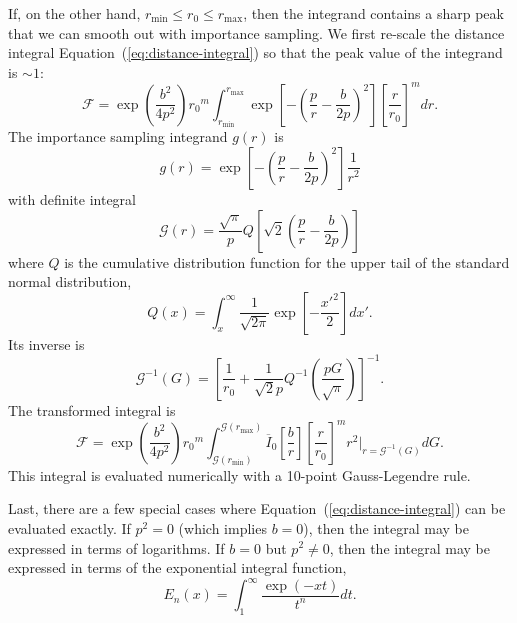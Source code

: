 \documentclass[amsmath,amssymb,aps,prx,reprint,nopreprintnumbers,nofootinbib]{revtex4-1}
\begin{document}
If, on the other hand, $r_\mathrm{min} \leq r_0 \leq r_\mathrm{max}$, then the integrand contains a sharp peak that we can smooth out with importance sampling. We first re-scale the distance integral Equation~(\ref{eq:distance-integral}) so that the peak value of the integrand is $\sim 1$:
%
\begin{equation}
    \mathscr{F} = \exp\left(\frac{b^2}{4p^2}\right)
        {r_0}^m
        \int_{r_\mathrm{min}}^{r_\mathrm{max}}
        \exp\left[-\left(\frac{p}{r} - \frac{b}{2p}\right)^2\right]
        \left[\frac{r}{r_0}\right]^m
        dr.
\end{equation}
%
The importance sampling integrand $g(r)$ is
%
\begin{equation}
    g(r) = \exp\left[-\left(\frac{p}{r} - \frac{b}{2p}\right)^2\right]
        \frac{1}{r^2}
\end{equation}
%
with definite integral
%
\begin{equation}
    \mathscr{G}(r) = \frac{\sqrt{\pi}}{p}
        Q\left[\sqrt{2}\left(\frac{p}{r} - \frac{b}{2p}\right)\right]
\end{equation}
%
where $Q$ is the cumulative distribution function for the upper tail of the standard normal distribution,
%
\begin{equation}
    Q(x) = \int_x^\infty \frac{1}{\sqrt{2\pi}} \exp \left[-\frac{{x'}^2}{2}\right] dx'.
\end{equation}
%
Its inverse is
%
\begin{equation}
    \mathscr{G}^{-1}(G) = \left[\frac{1}{r_0} + \frac{1}{\sqrt{2}p}
    Q^{-1}\left(\frac{p G}{\sqrt{\pi}}\right)\right]^{-1}.
\end{equation}
%
The transformed integral is
%
\begin{equation}
    \mathscr{F} = \exp\left(\frac{b^2}{4p^2}\right)
        {r_0}^m
        \int_{\mathscr{G}(r_\mathrm{min})}^{\mathscr{G}(r_\mathrm{max})}
        \overline{I}_0\left[\frac{b}{r}\right]
        \left[\frac{r}{r_0}\right]^m r^2
        \Bigg|_{r = \mathscr{G}^{-1}(G)}
        dG.
\end{equation}
%
This integral is evaluated numerically with a 10\nobreakdashes-point Gauss-Legendre rule.

Last, there are a few special cases where Equation~(\ref{eq:distance-integral}) can be evaluated exactly. If $p^2=0$ (which implies $b = 0$), then the integral may be expressed in terms of logarithms. If $b = 0$ but $p^2 \neq 0$, then the integral may be expressed in terms of the exponential integral function,
%
\begin{equation}
    E_n(x) = \int_1^\infty \frac{\exp (-xt)}{t^n} dt.
\end{equation}
\end{document}
